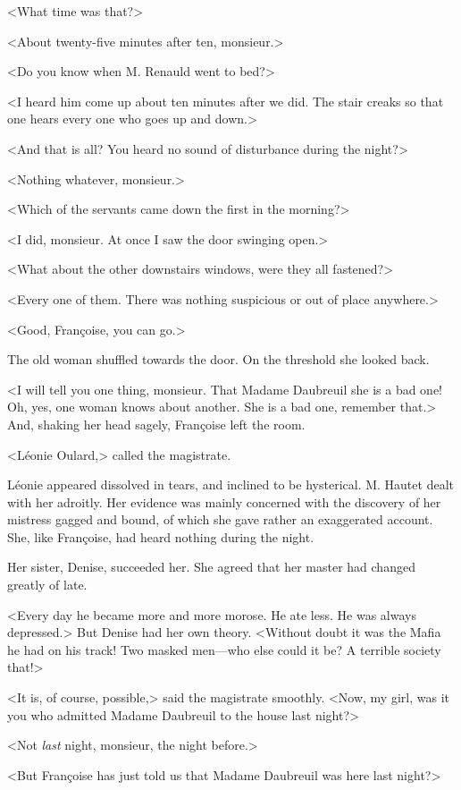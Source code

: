  <What time was that?> 

 <About twenty-five minutes after ten, monsieur.> 

 <Do you know when M. Renauld went to bed?> 

 <I heard him come up about ten minutes after we did. The stair creaks so that one hears every one who goes up and down.> 

 <And that is all? You heard no sound of disturbance during the night?> 

 <Nothing whatever, monsieur.> 

 <Which of the servants came down the first in the morning?> 

 <I did, monsieur. At once I saw the door swinging open.> 

 <What about the other downstairs windows, were they all fastened?> 

 <Every one of them. There was nothing suspicious or out of place anywhere.> 

 <Good, Françoise, you can go.> 

 The old woman shuffled towards the door. On the threshold she looked back. 

 <I will tell you one thing, monsieur. That Madame Daubreuil she is a bad one! Oh, yes, one woman knows about another. She is a bad one, remember that.> And, shaking her head sagely, Françoise left the room. 

 <Léonie Oulard,> called the magistrate. 

 Léonie appeared dissolved in tears, and inclined to be hysterical. M. Hautet dealt with her adroitly. Her evidence was mainly concerned with the discovery of her mistress gagged and bound, of which she gave rather an exaggerated account. She, like Françoise, had heard nothing during the night. 

 Her sister, Denise, succeeded her. She agreed that her master had changed greatly of late. 

 <Every day he became more and more morose. He ate less. He was always depressed.> But Denise had her own theory. <Without doubt it was the Mafia he had on his track! Two masked men—who else could it be? A terrible society that!> 

 <It is, of course, possible,> said the magistrate smoothly. <Now, my girl, was it you who admitted Madame Daubreuil to the house last night?> 

 <Not \emph{last} night, monsieur, the night before.> 

 <But Françoise has just told us that Madame Daubreuil was here last night?> 

